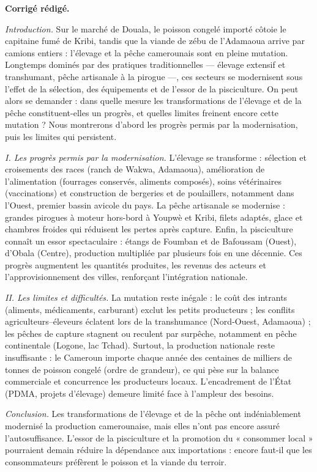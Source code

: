 \documentclass[11pt]{article}
\begin{document}
\begin{corrige}
\textbf{Corrigé rédigé.}

\emph{Introduction.} Sur le marché de Douala, le poisson congelé importé côtoie le capitaine fumé de Kribi, tandis que la viande de zébu de l'Adamaoua arrive par camions entiers : l'élevage et la pêche camerounais sont en pleine mutation. Longtemps dominés par des pratiques traditionnelles — élevage extensif et transhumant, pêche artisanale à la pirogue —, ces secteurs se modernisent sous l'effet de la sélection, des équipements et de l'essor de la pisciculture. On peut alors se demander : dans quelle mesure les transformations de l'élevage et de la pêche constituent-elles un progrès, et quelles limites freinent encore cette mutation ? Nous montrerons d'abord les progrès permis par la modernisation, puis les limites qui persistent.

\emph{I. Les progrès permis par la modernisation.} L'élevage se transforme : sélection et croisements des races (ranch de Wakwa, Adamaoua), amélioration de l'alimentation (fourrages conservés, aliments composés), soins vétérinaires (vaccinations) et construction de bergeries et de poulaillers, notamment dans l'Ouest, premier bassin avicole du pays. La pêche artisanale se modernise : grandes pirogues à moteur hors-bord à Youpwè et Kribi, filets adaptés, glace et chambres froides qui réduisent les pertes après capture. Enfin, la pisciculture connaît un essor spectaculaire : étangs de Foumban et de Bafoussam (Ouest), d'Obala (Centre), production multipliée par plusieurs fois en une décennie. Ces progrès augmentent les quantités produites, les revenus des acteurs et l'approvisionnement des villes, renforçant l'intégration nationale.

\emph{II. Les limites et difficultés.} La mutation reste inégale : le coût des intrants (aliments, médicaments, carburant) exclut les petits producteurs ; les conflits agriculteurs--éleveurs éclatent lors de la transhumance (Nord-Ouest, Adamaoua) ; les pêches de capture stagnent ou reculent par surpêche, notamment en pêche continentale (Logone, lac Tchad). Surtout, la production nationale reste insuffisante : le Cameroun importe chaque année des centaines de milliers de tonnes de poisson congelé (ordre de grandeur), ce qui pèse sur la balance commerciale et concurrence les producteurs locaux. L'encadrement de l'État (PDMA, projets d'élevage) demeure limité face à l'ampleur des besoins.

\emph{Conclusion.} Les transformations de l'élevage et de la pêche ont indéniablement modernisé la production camerounaise, mais elles n'ont pas encore assuré l'autosuffisance. L'essor de la pisciculture et la promotion du « consommer local » pourraient demain réduire la dépendance aux importations : encore faut-il que les consommateurs préfèrent le poisson et la viande du terroir.


\end{corrige}
\end{document}
